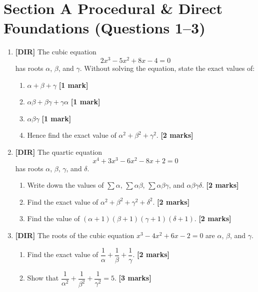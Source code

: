 \documentclass[11pt,a4paper]{article}
\begin{document}
\thispagestyle{plain}


\section*{Section A \quad Procedural \& Direct Foundations \hfill{\normalfont\footnotesize(Questions 1--3)}}
\begin{enumerate}

\item \textbf{[DIR]} The cubic equation
\[
2x^3 - 5x^2 + 8x - 4 = 0
\]
has roots $\alpha$, $\beta$, and $\gamma$. Without solving the equation, state the exact values of:
\begin{enumerate}[label=(\alph*)]
  \item $\alpha + \beta + \gamma$ \hfill{\textbf{[1 mark]}}
  \item $\alpha\beta + \beta\gamma + \gamma\alpha$ \hfill{\textbf{[1 mark]}}
  \item $\alpha\beta\gamma$ \hfill{\textbf{[1 mark]}}
  \item Hence find the exact value of $\alpha^2 + \beta^2 + \gamma^2$. \hfill{\textbf{[2 marks]}}
\end{enumerate}

\item \textbf{[DIR]} The quartic equation
\[
x^4 + 3x^3 - 6x^2 - 8x + 2 = 0
\]
has roots $\alpha$, $\beta$, $\gamma$, and $\delta$.
\begin{enumerate}[label=(\alph*)]
  \item Write down the values of $\sum\alpha$, $\sum\alpha\beta$, $\sum\alpha\beta\gamma$, and $\alpha\beta\gamma\delta$. \hfill{\textbf{[2 marks]}}
  \item Find the exact value of $\alpha^2 + \beta^2 + \gamma^2 + \delta^2$. \hfill{\textbf{[2 marks]}}
  \item Find the value of $(\alpha + 1)(\beta + 1)(\gamma + 1)(\delta + 1)$. \hfill{\textbf{[2 marks]}}
\end{enumerate}

\item \textbf{[DIR]} The roots of the cubic equation $x^3 - 4x^2 + 6x - 2 = 0$ are $\alpha$, $\beta$, and $\gamma$.
\begin{enumerate}[label=(\alph*)]
  \item Find the exact value of $\dfrac{1}{\alpha} + \dfrac{1}{\beta} + \dfrac{1}{\gamma}$. \hfill{\textbf{[2 marks]}}
  \item Show that $\dfrac{1}{\alpha^2} + \dfrac{1}{\beta^2} + \dfrac{1}{\gamma^2} = 5$. \hfill{\textbf{[3 marks]}}
\end{enumerate}

\end{enumerate}
\end{document}
